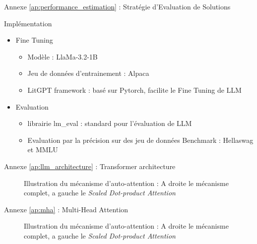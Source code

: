 \begin{frame}{Annexe \ref{ap:performance_estimation} : Stratégie d'Evaluation de Solutions}
    \label{ap:performance_estimation}
    \begin{block}{Implémentation}
        \begin{itemize}
            \item Fine Tuning
            \begin{itemize}
                \item Modèle : LlaMa-3.2-1B
                \item Jeu de données d'entrainement : Alpaca
                \item LitGPT framework : basé sur Pytorch, facilite le Fine Tuning de LLM
            \end{itemize}
            \item Evaluation
            \begin{itemize}
                \item librairie lm\_eval : standard pour l'évaluation de LLM
                \item Evaluation par la précision sur des jeu de données Benchmark : Hellaswag et MMLU
            \end{itemize}
        \end{itemize}

        
    \end{block}

\end{frame}

\begin{frame}{Annexe \ref{ap:llm_architecture} : Transformer architecture}
    \label{ap:llm_architecture}
    \begin{figure}
        \centering
        
        \caption{Illustration du mécanisme d'auto-attention : A droite le mécanisme complet, a gauche le \textit{Scaled Dot-product Attention}}
    \end{figure}
    
\end{frame}

\begin{frame}{Annexe \ref{ap:mha} : Multi-Head Attention}
    \label{ap:mha}
    \begin{figure}
        \centering
        
        \caption{Illustration du mécanisme d'auto-attention : A droite le mécanisme complet, a gauche le \textit{Scaled Dot-product Attention}}
    \end{figure}
    
\end{frame}

